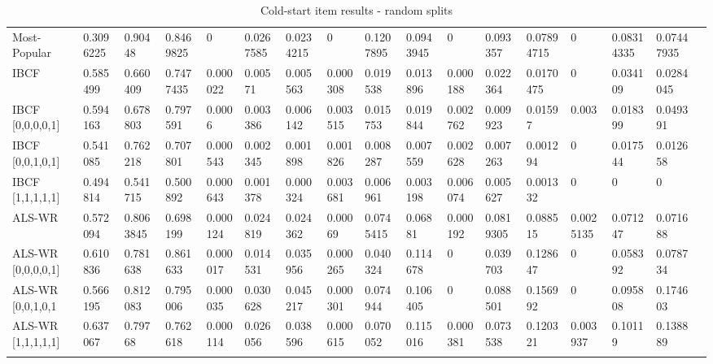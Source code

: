 \begin{table}[H]
{\begin{tabular}{*{17}{l}}
\rowcolor{Gray}
Most-Popular		& 0.3096225 & 0.90448 & 0.8469825 & 0 & 0.0267585 & 0.0234215 & 0 & 0.1207895 & 0.0943945 & 0 & 0.093357 & 0.07894715 & 0 & 0.08314335 & 	0.07447935 & \\
\rowcolor{Gray}
IBCF				& 0.585499& 0.660409& 	0.7477435 & 0.000022 & 0.00571 & 0.005563 & 0.000308 & 0.019538 & 0.013896 & 0.000188 & 0.022364 & 0.0170475 & 0 & 0.034109 & 0.0284045 & \\
IBCF [0,0,0,0,1] 	& 0.594163&	0.678803&	0.797591&	0.0006	&	0.003386&	0.006142&	0.003515&	0.015753&	0.019844	&	0.002762	&	0.009923	&	0.01597	&	0.003	&	0.018399	&	0.049391	& \\
IBCF [0,0,1,0,1] 	& 0.541085&	0.762218&	0.707801&	0.000543&	0.002345&	0.001898&	0.001826&	0.008287&	0.007559&	0.002628&	0.007263&	0.001294&	0	&	0.017544	&	0.012658	& \\
IBCF [1,1,1,1,1]	& 0.494814&	0.541715&	0.500892&	0.000643&	0.001378&	0.000324&	0.003681&	0.006961&	0.003198&	0.006074&	0.005627&	0.001332&	0	&	0	&	0	& \\
\rowcolor{Gray}
ALS-WR 				& 0.572094& 0.8063845& 	0.698199&   0.000124&	0.024819&	0.024362&	0.00069	&	0.0745415&	0.06881	&	0.000192&	0.0819305&	0.088515&	0.0025135&	0.071247&	0.071688	& \\
ALS-WR [0,0,0,0,1]  & 0.610836&	0.781638&	0.861633&	0.000017&	0.014531&	0.035956&	0.000265&	0.040324&	0.114678&	0	&	0.039703&	0.128647&	0	&	0.058392	&	0.078734	& \\
ALS-WR [0,0,1,0,1	& 0.566195&	0.812083&	0.795006&	0.000035&	0.030628&	0.045217&	0.000301&	0.074944&	0.106405&	0	&	0.088501&	0.156992&	0&	0.095808&	0.174603	& \\
ALS-WR [1,1,1,1,1]	& 0.637067& 0.79768	&	0.762618&	0.000114&	0.026056&	0.038596&	0.000615&	0.070052&	0.115016&	0.000381&	0.073538&	0.120321&	0.003937	&	0.10119	&	0.138889	& \\ \\

\bottomrule
\end{tabular}
}
\caption{Cold-start item results - random splits}
\end{table}

